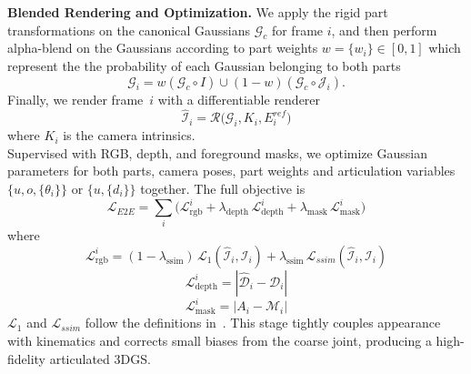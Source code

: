 \noindent\textbf{Blended Rendering and Optimization.} We apply the rigid part transformations on the canonical Gaussians $\mathcal{G}_c$ for frame $i$, and then perform alpha-blend on the Gaussians according to part weights $w=\{w_i\}\in [0,1]$ which represent the the probability of each Gaussian belonging to both parts
\[\textstyle \mathcal{G}_i = w(\mathcal{G}_c \circ I)\cup(1-w)(\mathcal{G}_c\circ\mathcal{J}_i).\]
Finally, we render frame~$i$ with a differentiable renderer
\[\textstyle \hat{\mathcal{I}}_i=\mathcal{R}\big(\mathcal{G}_i,{K}_i,{E}_i^{ref}\big)\]
where $K_i$ is the camera intrinsics.\\
Supervised with RGB, depth, and foreground masks, we optimize Gaussian parameters for both parts, camera poses, part weights and articulation variables $\{{u},{o},\{\theta_i\}\}$ or $\{{u},\{d_i\}\}$ together. The full objective is
\[\textstyle \mathcal{L}_{E2E}=\sum_i\big(\mathcal{L}_{\mathrm{rgb}}^i+\lambda_{\mathrm{depth}}\,\mathcal{L}_{\mathrm{depth}}^i+\lambda_{\mathrm{mask}}\,\mathcal{L}_{\mathrm{mask}}^i\big)\]
where
\[
\mathcal{L}_{\mathrm{rgb}}^i
=(1-\lambda_{\mathrm{ssim}})\,\mathcal{L}_{1}(\hat{\mathcal{I}}_i, \mathcal{I}_i)
  + \lambda_{\mathrm{ssim}}\,\mathcal{L}_{ssim}(\hat{\mathcal{I}}_i, \mathcal{I}_i)
\]
\[
\mathcal{L}_{\mathrm{depth}}^i
= \left| \hat{\mathcal{D}}_i - \mathcal{D}_i \right|
\]
\[
\mathcal{L}_{\mathrm{mask}}^i
= \left| A_i - {\mathcal{M}}_i \right|
\]
$\mathcal{L}_{1}$ and $\mathcal{L}_{ssim}$ follow the definitions in~\cite{kerbl20233d}. This stage tightly couples appearance with kinematics and corrects small biases from the coarse joint, producing a high-fidelity articulated 3DGS.